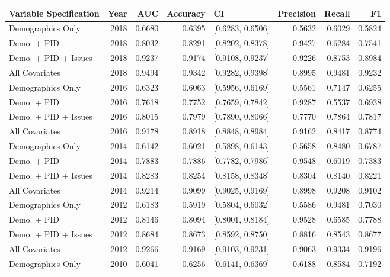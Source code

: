 \begin{table}[H]
\centering
\begin{tabular}{lrrrlrrr}
  \toprule
Variable Specification & Year & AUC & Accuracy & CI & Precision & Recall & F1 \\ 
  \midrule
Demographics Only & 2018 & 0.6680 & 0.6395 & [0.6283, 0.6506] & 0.5632 & 0.6029 & 0.5824 \\ 
  Demo. + PID & 2018 & 0.8032 & 0.8291 & [0.8202, 0.8378] & 0.9427 & 0.6284 & 0.7541 \\ 
  Demo. + PID + Issues & 2018 & 0.9237 & 0.9174 & [0.9108, 0.9237] & 0.9226 & 0.8753 & 0.8984 \\ 
  All Covariates & 2018 & 0.9494 & 0.9342 & [0.9282, 0.9398] & 0.8995 & 0.9481 & 0.9232 \\ 
  Demographics Only & 2016 & 0.6323 & 0.6063 & [0.5956, 0.6169] & 0.5561 & 0.7147 & 0.6255 \\ 
  Demo. + PID & 2016 & 0.7618 & 0.7752 & [0.7659, 0.7842] & 0.9287 & 0.5537 & 0.6938 \\ 
  Demo. + PID + Issues & 2016 & 0.8015 & 0.7979 & [0.7890, 0.8066] & 0.7770 & 0.7864 & 0.7817 \\ 
  All Covariates & 2016 & 0.9178 & 0.8918 & [0.8848, 0.8984] & 0.9162 & 0.8417 & 0.8774 \\ 
  Demographics Only & 2014 & 0.6142 & 0.6021 & [0.5898, 0.6143] & 0.5658 & 0.8480 & 0.6787 \\ 
  Demo. + PID & 2014 & 0.7883 & 0.7886 & [0.7782, 0.7986] & 0.9548 & 0.6019 & 0.7383 \\ 
  Demo. + PID + Issues & 2014 & 0.8283 & 0.8254 & [0.8158, 0.8348] & 0.8304 & 0.8140 & 0.8221 \\ 
  All Covariates & 2014 & 0.9214 & 0.9099 & [0.9025, 0.9169] & 0.8998 & 0.9208 & 0.9102 \\ 
  Demographics Only & 2012 & 0.6183 & 0.5919 & [0.5804, 0.6032] & 0.5586 & 0.9481 & 0.7030 \\ 
  Demo. + PID & 2012 & 0.8146 & 0.8094 & [0.8001, 0.8184] & 0.9528 & 0.6585 & 0.7788 \\ 
  Demo. + PID + Issues & 2012 & 0.8684 & 0.8673 & [0.8592, 0.8750] & 0.8816 & 0.8543 & 0.8677 \\ 
  All Covariates & 2012 & 0.9266 & 0.9169 & [0.9103, 0.9231] & 0.9063 & 0.9334 & 0.9196 \\ 
  Demographics Only & 2010 & 0.6041 & 0.6256 & [0.6141, 0.6369] & 0.6188 & 0.8584 & 0.7192 \\ 

\end{tabular}
\end{table}
